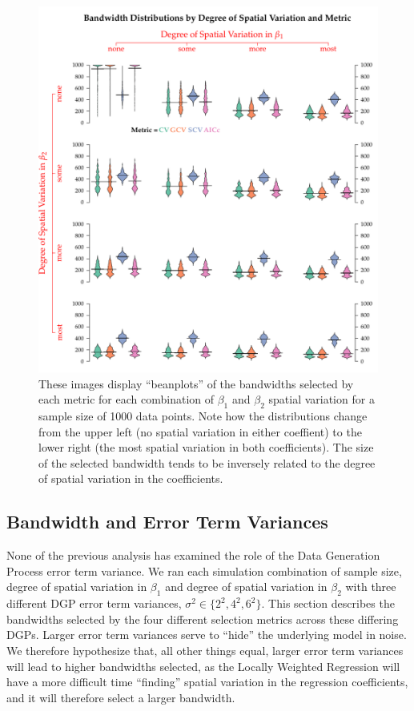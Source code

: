 \documentclass{article}\usepackage{graphicx, color}
\begin{document}
\begin{figure}\label{fig:bandwidthsSS1000bySpatVar}
\includegraphics{figure/bandwidthsSS1000bySpatVar.pdf}
\caption{These images display ``beanplots'' of the bandwidths selected by each metric for each combination of $\beta _1$ and $\beta _2$ spatial variation for a sample size of 1000 data points. Note how the distributions change from the upper left (no spatial variation in either coeffient) to the lower right (the most spatial variation in both coefficients). The size of the selected bandwidth tends to be inversely related to the degree of spatial variation in the coefficients.}
\end{figure}

\subsection{Bandwidth and Error Term Variances}

None of the previous analysis has examined the role of the Data Generation Process error term variance. We ran each simulation combination of sample size, degree of spatial variation in $\beta _1$ and degree of spatial variation in $\beta _2$ with three different DGP error term variances, $\sigma ^2 \in \{2^2, 4^2, 6^2\}$. This section describes the bandwidths selected by the four different selection metrics across these differing DGPs. Larger error term variances serve to ``hide'' the underlying model in noise. We therefore hypothesize that, all other things equal, larger error term variances will lead to higher bandwidths selected, as the Locally Weighted Regression will have a more difficult time ``finding'' spatial variation in the regression coefficients, and it will therefore select a larger bandwidth.
\end{document}
